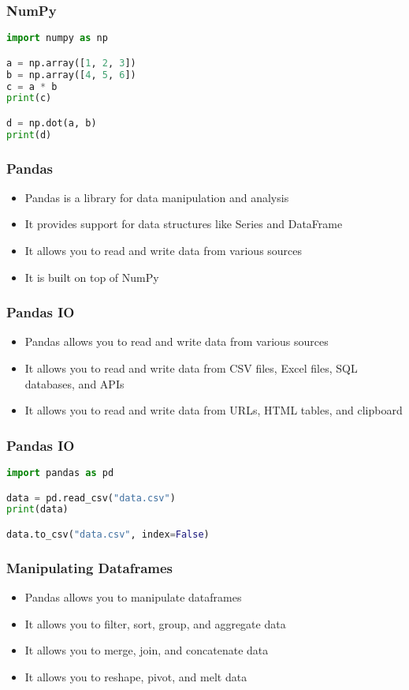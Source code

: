 \documentclass[serif, 9pt, aspectratio=32]{beamer}
\begin{document}
\begin{frame}[fragile]
    \frametitle{NumPy}
    \begin{lstlisting}[language=Python]
import numpy as np

a = np.array([1, 2, 3])
b = np.array([4, 5, 6])
c = a * b
print(c)

d = np.dot(a, b)
print(d)
    \end{lstlisting}
\end{frame}

\begin{frame}
    \centering
    \frametitle{Pandas}
    \begin{itemize}
        \setlength{\itemsep}{2em}
        \item Pandas is a library for data manipulation and analysis
        \item It provides support for data structures like Series and DataFrame
        \item It allows you to read and write data from various sources
        \item It is built on top of NumPy
    \end{itemize}
\end{frame}

\begin{frame}
    \centering
    \frametitle{Pandas IO}
    \begin{itemize}
        \setlength{\itemsep}{2em}
        \item Pandas allows you to read and write data from various sources
        \item It allows you to read and write data from CSV files, Excel files, SQL databases, and APIs
        \item It allows you to read and write data from URLs, HTML tables, and clipboard
    \end{itemize}
\end{frame}

\begin{frame}[fragile]
    \frametitle{Pandas IO}
    \begin{lstlisting}[language=Python]
import pandas as pd

data = pd.read_csv("data.csv")
print(data)

data.to_csv("data.csv", index=False)
    \end{lstlisting}
\end{frame}

\begin{frame}
    \centering
    \frametitle{Manipulating Dataframes}
    \begin{itemize}
        \setlength{\itemsep}{2em}
        \item Pandas allows you to manipulate dataframes
        \item It allows you to filter, sort, group, and aggregate data
        \item It allows you to merge, join, and concatenate data
        \item It allows you to reshape, pivot, and melt data
    \end{itemize}
\end{frame}
\end{document}
